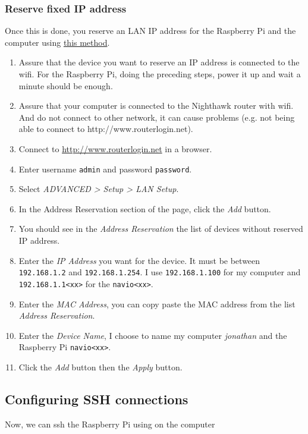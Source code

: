             \subsubsection{Reserve fixed IP address}
                Once this is done, you reserve an LAN IP address for the Raspberry Pi and the computer using \href{https://kb.netgear.com/24091/How-do-I-reserve-a-LAN-IP-address-on-my-Nighthawk-router}{this method}.
                \begin{enumerate}
                    \item Assure that the device you want to reserve an IP address is connected to the wifi. For the Raspberry Pi, doing the preceding steps, power it up and wait a minute should be enough.
                    \item Assure that your computer is connected to the Nighthawk router with wifi. And do not connect to other network, it can cause problems (e.g. not being able to connect to http://www.routerlogin.net).
                    \item Connect to \url{http://www.routerlogin.net} in a browser.
                    \item Enter username \texttt{admin} and password \texttt{password}.
                    \item Select \emph{ADVANCED > Setup > LAN Setup}.
                    \item In the Address Reservation section of the page, click the \emph{Add} button.
                    \item You should see in the \emph{Address Reservation} the list of devices without reserved IP address.
                    \item Enter the \emph{IP Address} you want for the device. It must be between \texttt{192.168.1.2} and \texttt{192.168.1.254}. I use \texttt{192.168.1.100} for my computer and \texttt{192.168.1.1<xx>} for the \texttt{navio<xx>}.
                    \item Enter the \emph{MAC Address}, you can copy paste the MAC address from the list \emph{Address Reservation}.
                    \item Enter the \emph{Device Name}, I choose to name my computer \emph{jonathan} and the Raspberry Pi \texttt{navio<xx>}.
                    \item Click the \emph{Add} button then the \emph{Apply} button.
                \end{enumerate}
        
        \subsection{Configuring SSH connections}       
                Now, we can ssh the Raspberry Pi using on the computer
